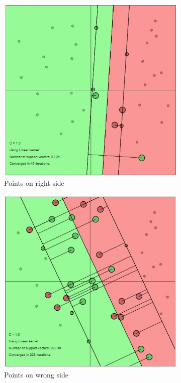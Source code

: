 \documentclass[12pt]{report}
\begin{document}
{	  \begin{figure}[ht] 
	  	\centering
	  	\begin{subfigure}{.3\textwidth}
	  		\centering
	  		\includegraphics[width=.7\linewidth]{linear_kernel_1.jpg}
	  		\caption{Points on right side}
	  		\label{fig:lin1}
	  	\end{subfigure}%
  		\begin{subfigure}{.3\textwidth}
  			\centering
  			\includegraphics[width=.7\linewidth]{linear_kernel_2.jpg}
  			\caption{Points on wrong side}
  			\label{fig:lin2}
  		\end{subfigure}%
  		\begin{subfigure}{.3\textwidth}
  			\centering

\end{subfigure}
\end{figure}}
\end{document}

